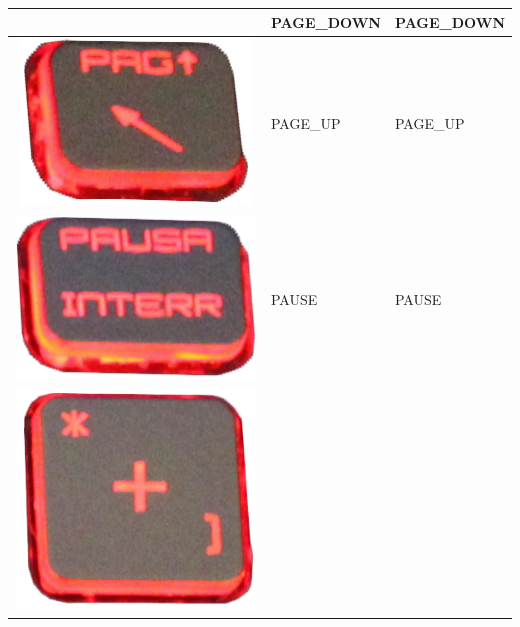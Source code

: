 \begin{longtable}{|cll|}
\begin{minipage}[c]{.4\textwidth}
\vspace{0.2cm}
\end{minipage} & PAGE\_DOWN & PAGE\_DOWN\\
\hline
\begin{minipage}[c]{.4\textwidth}
\vspace{0.2cm}
\includegraphics[scale=0.08]{Images/KeyMapping/PAGE_UP}
\vspace{0.2cm}
\end{minipage} & PAGE\_UP & PAGE\_UP\\
\hline
\begin{minipage}[c]{.4\textwidth}
\vspace{0.2cm}
\includegraphics[scale=0.08]{Images/KeyMapping/PAUSE}
\vspace{0.2cm}
\end{minipage} & PAUSE & PAUSE\\
\hline
\begin{minipage}[c]{.4\textwidth}
\vspace{0.2cm}
\includegraphics[scale=0.08]{Images/KeyMapping/PLUS}

\end{minipage}
\end{longtable}
